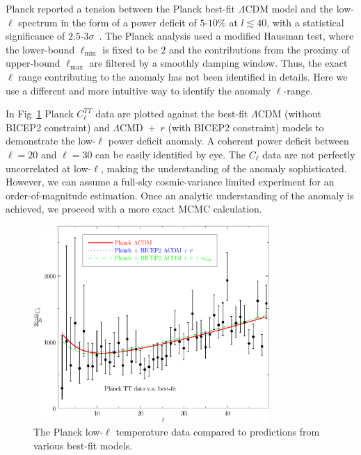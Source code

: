 \documentclass[11pt]{article}
\def \figwidth{0.8\textwidth}
\begin{document}
Planck reported a tension between the Planck best-fit $\Lambda$CDM model and the low-$\ell$ spectrum in the form of a power deficit of $5$-$10$\% at $l\lesssim 40$, with a statistical significance of $2.5$-$3\sigma$~\cite{Planck2013PowerSpectra}. The Planck analysis used a modified Hausman test, where the lower-bound $\ell_{\min}$ is fixed to be $2$ and the contributions from the proximy of upper-bound $\ell_{\max}$ are filtered by a smoothly damping window. Thus, the exact $\ell$ range contributing to the anomaly has not been identified in details. Here we use a different and more intuitive way to identify the anomaly $\ell$-range.


In Fig~\ref{fig:dcls} Planck $C_\ell^{TT}$ data are plotted against the best-fit $\Lambda$CDM (without BICEP2 constraint) and $\Lambda$CMD~+~$r$ (with BICEP2 constraint) models to demonstrate the low-$\ell$ power deficit anomaly. A coherent power deficit between $\ell=20$ and $\ell = 30$ can be easily identified by eye. The $C_{\ell}$ data are not perfectly uncorrelated at low-$\ell$, making the understanding of the anomaly sophisticated. However, we can assume a full-sky cosmic-variance limited experiment for an order-of-magnitude estimation. Once an analytic understanding of the anomaly is achieved, we proceed with a more exact MCMC calculation.

\begin{figure}
  \centering
  \includegraphics[width =\figwidth]{dcl.pdf}
  \caption{The Planck low-$\ell$ temperature data compared to predictions from various best-fit models. \label{fig:dcls}}
\end{figure}
\end{document}
